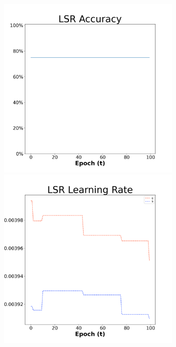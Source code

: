 \begin{figure}[H]
    \centering %
\begin{subfigure}{0.3\textwidth}
  \includegraphics[width=\linewidth]{images/exper1/Ionosphere/LSR_0.01_acc.png}
    \includegraphics[width=\linewidth]{images/exper1/Ionosphere/LSR_0.01_lr.png}

\end{subfigure}
\end{figure}
